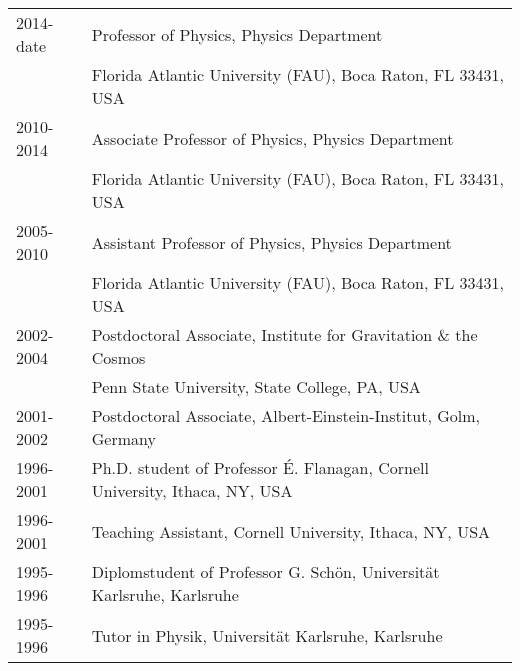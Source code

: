 \documentclass[11pt]{article}
\begin{document}
\medskip
\begin{tabular}{ll}
{2014-date}	& Professor of Physics,
		  {Physics Department}\\
		& {Florida Atlantic University (FAU),}
		  {Boca Raton, FL 33431, USA}\\

{2010-2014}	& Associate Professor of Physics,
		  {Physics Department}\\
		& {Florida Atlantic University (FAU),}
		  {Boca Raton, FL 33431, USA}\\

{2005-2010}	& Assistant Professor of Physics,
		  {Physics Department}\\
		& {Florida Atlantic University (FAU),}
		  {Boca Raton, FL 33431, USA}\\

{2002-2004}	& Postdoctoral Associate, 
		 {Institute for Gravitation \& the Cosmos}\\ 
		& {Penn State University,}
		  {State College, PA, USA} \\

{2001-2002}	& Postdoctoral Associate,
		 {Albert-Einstein-Institut,}
		 {Golm, Germany} \\

{1996-2001}	& Ph.D. student of Professor \'E. Flanagan,
		  {Cornell University, Ithaca, NY, USA}\\

{1996-2001}	& Teaching Assistant,
		  {Cornell University, Ithaca, NY, USA}\\

{1995-1996}	& Diplomstudent of Professor G. Sch\"on,
		  {Universit\"at Karlsruhe, Karlsruhe}\\

{1995-1996}	& Tutor in Physik,
		 {Universit\"at Karlsruhe, Karlsruhe}\\
\end{tabular}

%
%
%
%
%
%
\end{document}
